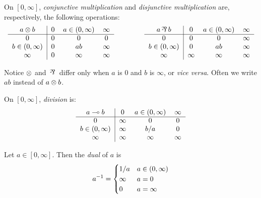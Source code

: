 \begin{definition}[Multiplication]
\label{Multiplication}
    On $[0,\infty]$, \emph{conjunctive multiplication} and \emph{disjunctive multiplication} are, respectively, the following operations:
    \begin{equation*}
		\begin{tabular}{c|ccc}
			$a \conmul{} b$ & $0$ & $a \in (0,\infty)$ & $\infty$\\
			\cline{1-4}
			$0$ 			   & $0$ & $0$ 		& $0$\\
			$b \in (0,\infty)$ & $0$ & $ab$		& $\infty$\\
			$\infty$ 		   & $0$ & $\infty$ & $\infty$
		\end{tabular}
		\hspace*{10ex}
		\begin{tabular}{c|ccc}
			\textnormal{$a \dismul{} b$} & $0$ & $a \in (0,\infty)$ & $\infty$\\
			\cline{1-4}
			$0$ 		 	   & $0$ 		& $0$ 	   & $\infty$\\
			$b \in (0,\infty)$ & $0$ 		& $ab$	   & $\infty$\\
			$\infty$ 		   & $\infty$ 	& $\infty$ & $\infty$
		\end{tabular}
	\end{equation*}
\end{definition}

Notice $\otimes{}$ and $\dismul{}$ differ only when $a$ is $0$ and $b$ is $\infty$, or \textit{vice versa}. Often we write $ab$ instead of $a \otimes{} b$.

\begin{definition}[Division]
\label{Division}
    On $[0,\infty]$, \emph{division} is:
    \begin{equation*}
		\begin{tabular}{c|ccc}
			$a \ediv{} b$ & $0$ & $a \in (0,\infty)$ & $\infty$\\
			\cline{1-4}
			$0$ 			   & $\infty$ & $0$ 		& $0$\\
			$b \in (0,\infty)$ & $\infty$ & $b/a$		& $0$\\
			$\infty$ 		   & $\infty$ & $\infty$ & $\infty$
		\end{tabular}
	\end{equation*}
\end{definition}

\begin{definition}
\label{dual}
    Let $a \in [0,\infty]$. Then the \emph{dual} of $a$ is
    \[  a ^{-1} =
    \begin{cases}
    1/a  & a \in (0,\infty)  \\
    \infty & a = 0 \\
    0 & a = \infty \\
   \end{cases}
    \]
\end{definition}

